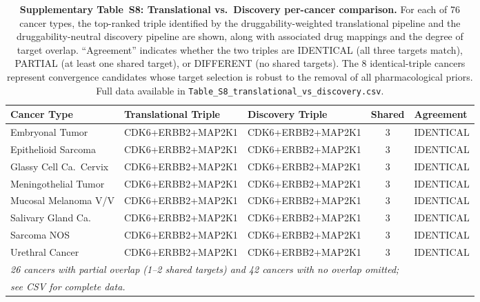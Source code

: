 \documentclass[11pt]{article}
\begin{document}
\begin{table}[htbp]
\centering
\caption{\textbf{Supplementary Table~S8: Translational vs.\ Discovery per-cancer comparison.} For each of 76 cancer types, the top-ranked triple identified by the druggability-weighted translational pipeline and the druggability-neutral discovery pipeline are shown, along with associated drug mappings and the degree of target overlap. ``Agreement'' indicates whether the two triples are IDENTICAL (all three targets match), PARTIAL (at least one shared target), or DIFFERENT (no shared targets). The 8 identical-triple cancers represent convergence candidates whose target selection is robust to the removal of all pharmacological priors. Full data available in \texttt{Table\_S8\_translational\_vs\_discovery.csv}.}
\label{tab:s8_dual_track}
\scriptsize
\begin{tabular}{p{3.2cm}p{3cm}p{3cm}cp{1.2cm}}
\toprule
\textbf{Cancer Type} & \textbf{Translational Triple} & \textbf{Discovery Triple} & \textbf{Shared} & \textbf{Agreement} \\
\midrule
Embryonal Tumor & CDK6+ERBB2+MAP2K1 & CDK6+ERBB2+MAP2K1 & 3 & IDENTICAL \\
Epithelioid Sarcoma & CDK6+ERBB2+MAP2K1 & CDK6+ERBB2+MAP2K1 & 3 & IDENTICAL \\
Glassy Cell Ca.\ Cervix & CDK6+ERBB2+MAP2K1 & CDK6+ERBB2+MAP2K1 & 3 & IDENTICAL \\
Meningothelial Tumor & CDK6+ERBB2+MAP2K1 & CDK6+ERBB2+MAP2K1 & 3 & IDENTICAL \\
Mucosal Melanoma V/V & CDK6+ERBB2+MAP2K1 & CDK6+ERBB2+MAP2K1 & 3 & IDENTICAL \\
Salivary Gland Ca. & CDK6+ERBB2+MAP2K1 & CDK6+ERBB2+MAP2K1 & 3 & IDENTICAL \\
Sarcoma NOS & CDK6+ERBB2+MAP2K1 & CDK6+ERBB2+MAP2K1 & 3 & IDENTICAL \\
Urethral Cancer & CDK6+ERBB2+MAP2K1 & CDK6+ERBB2+MAP2K1 & 3 & IDENTICAL \\
\midrule
\multicolumn{5}{l}{\textit{26 cancers with partial overlap (1--2 shared targets) and 42 cancers with no overlap omitted;}} \\
\multicolumn{5}{l}{\textit{see CSV for complete data.}} \\
\bottomrule
\end{tabular}
\end{table}
\end{document}
